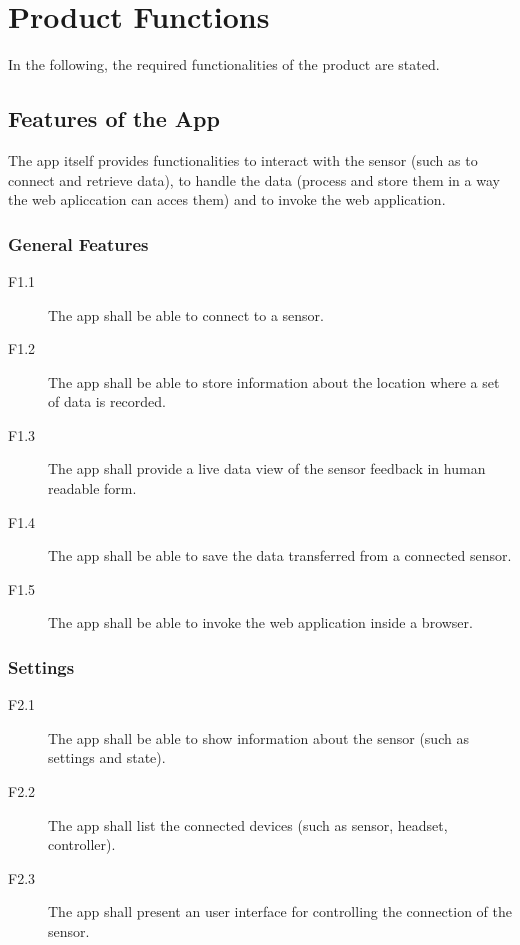 \section{Product Functions}

In the following, the required functionalities of the product are stated.

\subsection{Features of the App}

The app itself provides functionalities to interact with the sensor (such as to connect and retrieve data), to handle the data (process and store them in a way the web apliccation can acces them) and to invoke the web application.

\subsubsection{General Features}

\begin{description}
  \item[F1.1] The app shall be able to connect to a sensor.
  \item[F1.2] The app shall be able to store information about the location where a set of data is recorded.
  \item[F1.3] The app shall provide a live data view of the sensor feedback in human readable form.
  \item[F1.4] The app shall be able to save the data transferred from a connected sensor.
  \item[F1.5] The app shall be able to invoke the web application inside a browser.
\end{description}

\subsubsection{Settings}

\begin{description}
      \item[F2.1] The app shall be able to show information about the sensor (such as settings and state).
      \item[F2.2] The app shall list the connected devices (such as sensor, headset, controller). 
      \item[F2.3] The app shall present an user interface for controlling the connection of the sensor. 
    \end{description}

